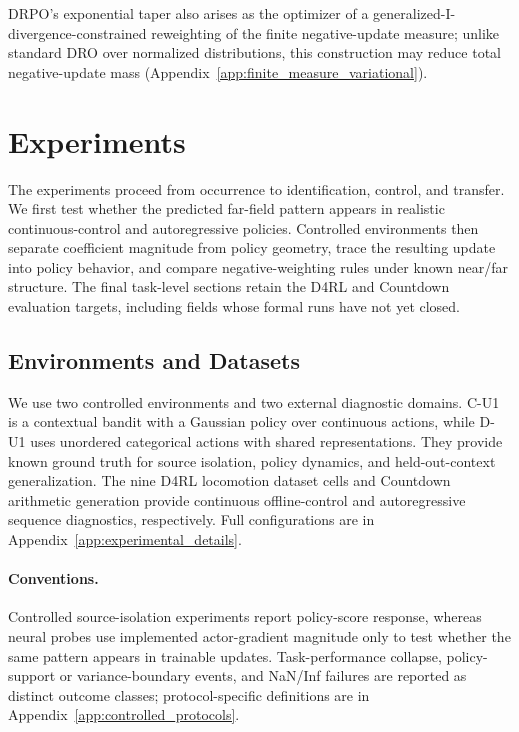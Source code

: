 \documentclass[sigconf,anonymous,review]{acmart}
\theoremstyle{acmdefinition}
\begin{document}
DRPO's exponential taper also arises as the optimizer of a
generalized-I-divergence-constrained reweighting of the finite
negative-update measure; unlike standard DRO over normalized distributions,
this construction may reduce total negative-update mass
(Appendix~\ref{app:finite_measure_variational}).

\section{Experiments}
\label{sec:experiments}

The experiments proceed from occurrence to identification, control, and
transfer. We
first test whether the predicted far-field pattern appears in realistic
continuous-control and autoregressive policies. Controlled environments then
separate coefficient magnitude from policy geometry, trace the resulting
update into policy behavior, and compare negative-weighting rules under known
near/far structure. The final task-level sections retain the D4RL and Countdown
evaluation targets, including fields whose formal runs have not yet closed.

\subsection{Environments and Datasets}
\label{sec:environments_datasets}

We use two controlled environments and two external diagnostic domains.
C-U1 is a contextual bandit with a Gaussian policy over continuous actions,
while D-U1 uses unordered categorical actions with shared representations.
They provide known ground truth for source isolation, policy dynamics, and
held-out-context generalization. The nine D4RL locomotion dataset cells and
Countdown arithmetic generation provide continuous offline-control and
autoregressive sequence diagnostics, respectively. Full configurations are
in Appendix~\ref{app:experimental_details}.

\paragraph{Conventions.}
Controlled source-isolation experiments report policy-score response,
whereas neural probes use implemented actor-gradient magnitude only to
test whether the same pattern appears in trainable updates.
Task-performance collapse, policy-support or variance-boundary events,
and NaN/Inf failures are reported as distinct outcome classes;
protocol-specific definitions are in
Appendix~\ref{app:controlled_protocols}.
\end{document}
